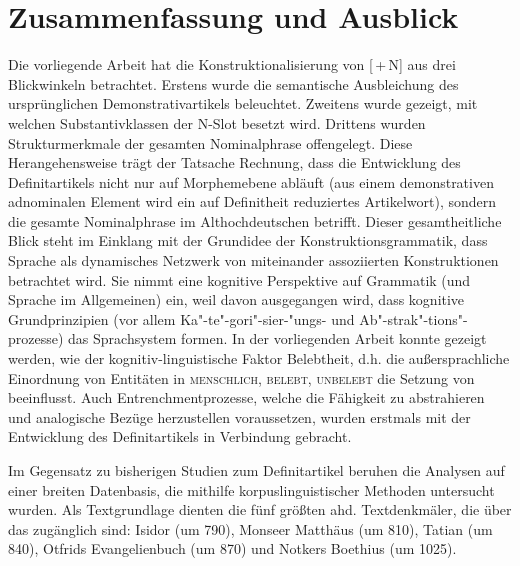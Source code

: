 \chapter{Zusammenfassung und Ausblick}\label{kapitel:zusammenfassung}

Die vorliegende Arbeit hat die Konstruktionalisierung von [\,+\,N] aus drei Blickwinkeln betrachtet. Erstens wurde die semantische Ausbleichung des ursprünglichen Demonstrativartikels beleuchtet. Zweitens wurde gezeigt, mit welchen Substantivklassen der N-Slot besetzt wird. Drittens wurden Strukturmerkmale der gesamten Nominalphrase offengelegt. 
Diese Herangehensweise trägt der Tatsache Rechnung, dass die Entwicklung des Definitartikels nicht nur auf Morphemebene abläuft (aus einem demonstrativen adnominalen Element wird ein auf Definitheit reduziertes Artikelwort), sondern die gesamte Nominalphrase im Althochdeutschen betrifft. Dieser gesamtheitliche Blick steht im Einklang mit der Grundidee der Konstruktionsgrammatik, dass Sprache als dynamisches Netzwerk von miteinander assoziierten Konstruktionen betrachtet wird. Sie nimmt eine kognitive Perspektive auf Grammatik (und Sprache im Allgemeinen) ein, weil davon ausgegangen wird, dass kognitive Grundprinzipien (vor allem Ka"-te"-gori"-sier-"ungs- und Ab"-strak"-tions"-prozesse) das Sprachsystem formen. In der vorliegenden Arbeit konnte gezeigt werden, wie der kognitiv-linguistische Faktor Belebtheit, d.h. die außersprachliche Einordnung von Entitäten in \textsc{menschlich, belebt, unbelebt} die Setzung von  beeinflusst. Auch Entrenchmentprozesse, welche die Fähigkeit zu abstrahieren und analogische Bezüge herzustellen voraussetzen, wurden erstmals mit der Entwicklung des Definitartikels in Verbindung gebracht.

Im Gegensatz zu bisherigen Studien zum Definitartikel beruhen die Analysen auf einer breiten Datenbasis, die mithilfe korpuslinguistischer Methoden untersucht wurden. Als Textgrundlage dienten die fünf größten ahd. Textdenkmäler, die über das  zugänglich sind: Isidor (um 790), Monseer Matthäus (um 810), Tatian (um 840), Otfrids Evangelienbuch (um 870) und Notkers Boethius (um 1025). 

